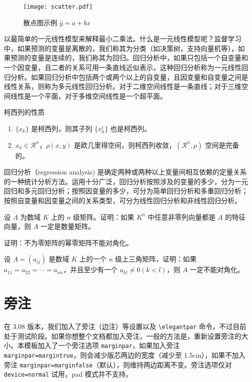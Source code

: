 \documentclass[cn,11pt]{elegantbook}
\begin{document}
\begin{figure}[htbp]
	\centering
	\texttt{[image: scatter.pdf]}
	\caption{散点图示例 $\hat{y}=a+bx$ \label{fig:scatter}}
\end{figure}

以最简单的一元线性模型来解释最小二乘法。什么是一元线性模型呢？监督学习中，如果预测的变量是离散的，我们称其为分类（如决策树，支持向量机等），如果预测的变量是连续的，我们称其为回归。回归分析中，如果只包括一个自变量和一个因变量，且二者的关系可用一条直线近似表示，这种回归分析称为一元线性回归分析。如果回归分析中包括两个或两个以上的自变量，且因变量和自变量之间是线性关系，则称为多元线性回归分析。对于二维空间线性是一条直线；对于三维空间线性是一个平面，对于多维空间线性是一个超平面。

\begin{property}\label{property:cauchy}
柯西列的性质
\begin{enumerate}
\item $\{x_k\}$ 是柯西列，则其子列 $\{x_k^i\}$ 也是柯西列。
\item $x_k\in \mathcal{R}^n$，$\rho(x,y)$ 是欧几里得空间，则柯西列收敛，$(\mathcal{R}^n,\rho)$ 空间是完备的。
\end{enumerate}
\end{property}

\begin{conclusion}
回归分析（regression analysis) 是确定两种或两种以上变量间相互依赖的定量关系的一种统计分析方法。运用十分广泛，回归分析按照涉及的变量的多少，分为一元回归和多元回归分析；按照因变量的多少，可分为简单回归分析和多重回归分析；按照自变量和因变量之间的关系类型，可分为线性回归分析和非线性回归分析。
\end{conclusion}

\begin{problemset}
\item 设 $A$ 为数域 $K$ 上的 $n$ 级矩阵。证明：如果 $K^n$ 中任意非零列向量都是 $A$ 的特征向量，则 $A$ 一定是数量矩阵。
\item 证明：不为零矩阵的幂零矩阵不能对角化。
\item 设 $A = (a_{ij})$ 是数域 $K$ 上的一个 $n$ 级上三角矩阵，证明：如果 $a_{11} = a_{22} = \cdots = a_{nn}$，并且至少有一个 $a_{kl} \not = 0 (k < l)$，则 $A$ 一定不能对角化。
\end{problemset}

\chapter{旁注}
在 3.08 版本，我们加入了旁注（边注）等设置以及 \lstinline{\elegantpar} 命令，不过目前处于测试阶段。如果你想整个文档都加入旁注，一般的方法是，重新设置旁注的大小。本模板加入了一个旁注选项 \lstinline{marginpar}，如果加入旁注 \lstinline{marginpar=margintrue}，则会减少版芯两边的宽度（减少至 1.5cm），如果不加入旁注 \lstinline{marginpar=marginfalse}（默认），则维持两边距离不变。旁注选项仅对 \lstinline{device=normal} 试用，pad 模式并不支持。
\end{document}
